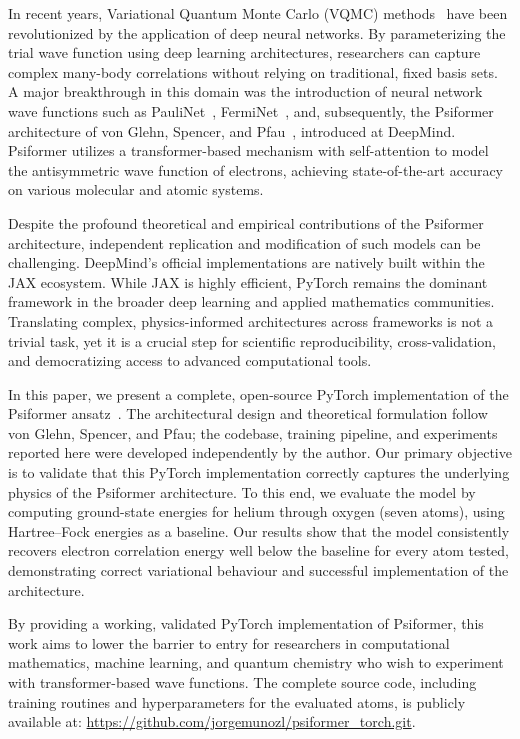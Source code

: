 In recent years, Variational Quantum Monte Carlo (VQMC) methods~\cite{foulkes} have been revolutionized
by the application of deep neural networks.
By parameterizing the trial wave function using deep learning architectures,
researchers can capture complex many-body correlations without relying on traditional,
fixed basis sets. A major breakthrough in this domain was the introduction of
neural network wave functions such as PauliNet~\cite{paulinet}, FermiNet~\cite{ferminet}, and, subsequently,
the Psiformer architecture of von Glehn, Spencer, and Pfau~\cite{psiformer}, introduced at DeepMind.
Psiformer utilizes a transformer-based mechanism with self-attention to model the
antisymmetric wave function of electrons, achieving state-of-the-art
accuracy on various molecular and atomic systems.

Despite the profound theoretical and empirical contributions of the Psiformer architecture,
independent replication and modification of such models can be challenging.
DeepMind’s official implementations are natively built within the JAX ecosystem.
While JAX is highly efficient, PyTorch remains the dominant framework in the broader deep
learning and applied mathematics communities. Translating complex,
physics-informed architectures across frameworks is not a trivial task,
yet it is a crucial step for scientific reproducibility,
cross-validation, and democratizing access to advanced computational tools.

In this paper, we present a complete, open-source PyTorch implementation of the Psiformer ansatz~\cite{psiformer}. The architectural design and theoretical formulation follow von Glehn, Spencer, and Pfau; the codebase, training pipeline, and experiments reported here were developed independently by the author.
Our primary objective is to validate that this PyTorch implementation
correctly captures the underlying physics of the Psiformer architecture.
To this end, we evaluate the model by computing ground-state energies for
helium through oxygen (seven atoms), using Hartree--Fock energies as a baseline.
Our results show that the model consistently recovers electron correlation energy
well below the baseline for every atom tested, demonstrating correct
variational behaviour and successful implementation of the architecture.

By providing a working, validated PyTorch implementation of Psiformer,
this work aims to lower the barrier to entry for researchers
in computational mathematics, machine learning, and quantum
chemistry who wish to experiment with transformer-based wave functions.
The complete source code, including training routines and hyperparameters for the
evaluated atoms, is publicly available at: \url{https://github.com/jorgemunozl/psiformer_torch.git}.

